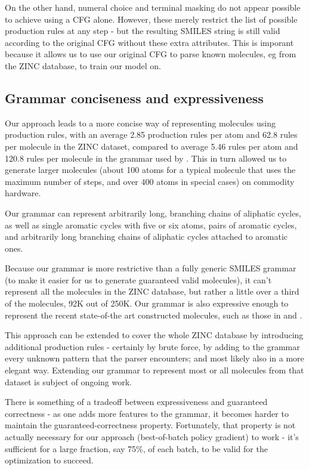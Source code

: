 \documentclass{article}
\begin{document}
On the other hand, numeral choice and terminal masking do not appear possible to achieve using a CFG alone. However, these merely restrict the list of possible production rules at any step - but the resulting SMILES string is still valid according to the original CFG without these extra attributes. This is imporant because it allows us to use our original CFG to parse known molecules, eg from the ZINC database, to train our model on.


\subsection{Grammar conciseness and expressiveness}\label{sec:expressiveness}
Our approach leads to a more concise way of representing molecules using production rules, with an average 2.85 production rules per atom and 62.8 rules per molecule in the ZINC dataset, compared to average 5.46 rules per atom and 120.8 rules per molecule in the grammar used by \cite{kusner17}. This in turn allowed us to generate larger molecules (about 100 atoms for a typical molecule that uses the maximum number of steps, and over 400 atoms in special cases) on commodity hardware.

Our grammar can represent arbitrarily long, branching chains of aliphatic cycles, as well as single aromatic cycles with five or six atoms, pairs of aromatic cycles, and arbitrarily long branching chains of aliphatic cycles attached to aromatic ones.

Because our grammar is more restrictive than a fully generic SMILES grammar (to make it easier for us to generate guaranteed valid molecules), it can't represent all the molecules in the ZINC database, but rather a little over a third of the molecules, 92K out of 250K. Our grammar is also  expressive enough to represent the recent state-of-the art constructed molecules, such as those in \cite{kusner17} and \cite{jin18}. 

This approach can be extended to cover the whole ZINC database by introducing additional production rules - certainly by brute force, by adding to the grammar every unknown pattern that the parser encounters; and most likely also in a more elegant way. Extending our grammar to represent most or all molecules from that dataset is subject of ongoing work.

There is something of a tradeoff between expressiveness and guaranteed correctness - as one adds more features to the grammar, it becomes harder to maintain the guaranteed-correctness property. Fortunately, that property is not actually necessary for our approach (best-of-batch policy gradient) to work - it's sufficient for a large fraction, say 75\%, of each batch, to be valid for the optimization to succeed.
\end{document}
